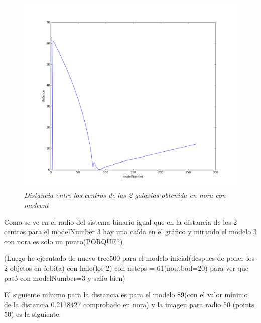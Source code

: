 \documentclass[12pt]{book}
\begin{document}
\begin{itemize}
\begin{figure}[h!]
 \centering
 \includegraphics[scale=0.4]{imgDistcon.png}
 \caption{\emph{Distancia entre los centros de las 2 galaxias obtenida en nora con medcent}}
 \label{Fig: 3}
\end{figure}

Como se ve en el radio del sistema binario igual que en la distancia de los 2 centros para el modelNumber 3 hay una caída en el gráfico y mirando el modelo 3 con nora es solo un punto(PORQUE?)

(Luego he ejecutado de nuevo tree500 para el modelo inicial(despues de poner los 2 objetos en órbita) con halo(los 2) con nsteps = 61(noutbod=20) para ver que pasó con modelNumber=3 y salio bien)

El siguiente  mínimo para la distancia es para el modelo 89(con el valor mínimo de la distancia 0.2118427 comprobado en nora) y la imagen para radio 50 (points 50) es la siguiente:


\end{itemize}
\end{document}
